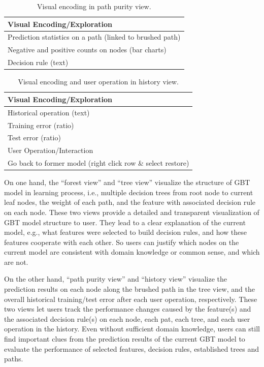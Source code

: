 \documentclass{chi2009}
\begin{document}
\begin{table}[ht]
\caption{Visual encoding in path purity view.}
\begin{center}
\begin{tabular}{|l|}
\hline
Visual Encoding/Exploration\\
\hline
Prediction statistics on a path (linked to brushed path)\\
Negative and positive counts on nodes (bar charts)\\
Decision rule (text)\\
\hline
\end{tabular}
\end{center}
\end{table}

\begin{table}[ht]
\caption{Visual encoding and user operation in history view.}
\begin{center}
\begin{tabular}{|l|}
\hline
Visual Encoding/Exploration\\
\hline
Historical operation (text)\\
Training error (ratio)\\
Test error (ratio)\\
\hline
\hline 
User Operation/Interaction\\
\hline
Go back to former model (right click row \& select restore)\\
\hline
\end{tabular}
\end{center}
\end{table}

On one hand, the ``forest view'' and ``tree view'' visualize the structure of GBT model in learning process, i.e., multiple decision trees from root node to current leaf nodes, the weight of each path, and the feature with associated decision rule on each node. These two views provide a detailed and transparent visualization of GBT model structure to user. They lead to a clear explanation of the current model, e.g., what features were selected to build decision rules, and how these features cooperate with each other. So users can justify which nodes on the current model are consistent with domain knowledge or common sense, and which are not. 

On the other hand, ``path purity view'' and ``history view'' visualize the prediction results on each node along the brushed path in the tree view, and the overall historical training/test error after each user operation, respectively. These two views let users track the performance changes caused by the feature(s) and the associated decision rule(s) on each node, each pat, each tree, and each user operation in the history. Even without sufficient domain knowledge, users can still find important clues from the prediction results of the current GBT model to evaluate the performance of selected features, decision rules, established trees and paths. 
\end{document}
